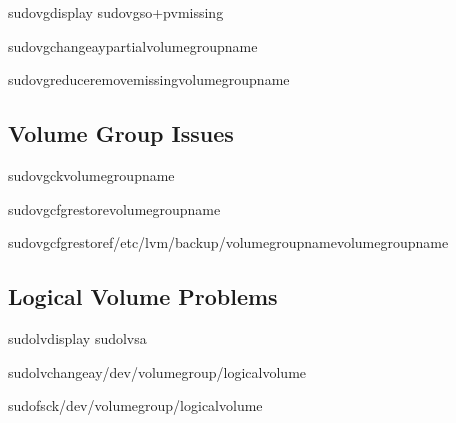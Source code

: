 \documentclass[letterpaper,10pt,english]{sphinxmanual}
\begin{document}
\sphinxAtStartPar
{}

\begin{sphinxVerbatim}[commandchars=\\\{\}]
sudovgdisplay
sudovgs\PYGZhy{}o+pv\PYGZus{}missing

sudovgchange\PYGZhy{}ay\PYGZhy{}\PYGZhy{}partialvolume\PYGZus{}group\PYGZus{}name

sudovgreduce\PYGZhy{}\PYGZhy{}removemissingvolume\PYGZus{}group\PYGZus{}name
\end{sphinxVerbatim}


\subsection{Volume Group Issues}
\label{\detokenize{troubleshooting:volume-group-issues}}
\sphinxAtStartPar
{}

\begin{sphinxVerbatim}[commandchars=\\\{\}]
sudovgckvolume\PYGZus{}group\PYGZus{}name

sudovgcfgrestorevolume\PYGZus{}group\PYGZus{}name

sudovgcfgrestore\PYGZhy{}f/etc/lvm/backup/volume\PYGZus{}group\PYGZus{}namevolume\PYGZus{}group\PYGZus{}name
\end{sphinxVerbatim}


\subsection{Logical Volume Problems}
\label{\detokenize{troubleshooting:logical-volume-problems}}
\sphinxAtStartPar
{}

\begin{sphinxVerbatim}[commandchars=\\\{\}]
sudolvdisplay
sudolvs\PYGZhy{}a

sudolvchange\PYGZhy{}ay/dev/volume\PYGZus{}group/logical\PYGZus{}volume

sudofsck/dev/volume\PYGZus{}group/logical\PYGZus{}volume
\end{sphinxVerbatim}
\end{document}
